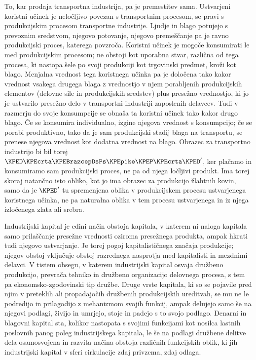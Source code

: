 \documentclass[kapital_02.tex]{subfiles}
\begin{document}
To, kar prodaja transportna industrija, pa je premestitev sama. Ustvarjeni koristni učinek je neločljivo povezan s transportnim procesom, se pravi s produkcijskim procesom transportne industrije. Ljudje in blago potujejo s prevoznim sredstvom, njegovo potovanje, njegovo premeščanje pa je ravno produkcijski proces, katerega povzroča. Koristni učinek je mogoče konsumirati le med produkcijskim procesom; ne obstoji kot uporabna stvar, različna od tega procesa, ki nastopa šele po svoji produkciji kot trgovinski predmet, kroži kot blago. Menjalna vrednost tega koristnega učinka pa je določena tako kakor vrednost vsakega drugega blaga z vrednostjo v njem porabljenih produkcijskih elementov (delovne sile in produkcijskih sredstev) plus presežno vrednostjo, ki jo je ustvarilo presežno delo v transportni industriji zaposlenih delavcev. Tudi v razmerju do svoje konsumpcije se obnaša ta koristni učinek tako kakor drugo blago. Če se konsumira individualno, izgine njegova vrednost s konsumpcijo; če se porabi produktivno, tako da je sam produkcijski stadij blaga na transportu, se prenese njegova vrednost kot dodatna vrednost na blago. Obrazec za transportno industrijo bi bil torej \(\KPED \KPEcrta \KPEBrazcepDsPs \KPEpike \KPEP \KPEcrta \KPED' \), ker plačamo in konsumiramo sam produkcijski proces, ne pa od njega ločljivi produkt. Ima torej skoraj natančno isto obliko, kot jo ima obrazec za produkcijo žlahtnih kovin, samo da je \(\KPED'\) tu spremenjena \KPEstran oblika v produkcijskem procesu ustvarjenega koristnega učinka, ne pa naturalna oblika v tem procesu ustvarjenega in iz njega izločenega zlata ali srebra.

Industrijski kapital je edini način obstoja kapitala, v katerem ni naloga kapitala samo prilaščanje presežne vrednosti oziroma presežnega produkta, ampak hkrati tudi njegovo ustvarjanje. Je torej pogoj kapitalističnega značaja produkcije; njegov obstoj vključuje obstoj razrednega nasprotja med kapitalisti in mezdnimi delavci. V tistem obsegu, v katerem industrijski kapital osvaja družbeno produkcijo, prevrača tehniko in družbeno organizacijo delovnega procesa, s tem pa ekonomsko-zgodovinski tip družbe. Druge vrste kapitala, ki so se pojavile pred njim v preteklih ali propadajočih družbenih produkcijskih ureditvah, se mu ne le podredijo in prilagodijo z mehanizmom svojih funkcij, ampak delujejo samo še na njegovi podlagi, živijo in umrjejo, stoje in padejo s to svojo podlago. Denarni in blagovni kapital sta, kolikor nastopata s svojimi funkcijami kot nosilca lastnih poslovnih panog poleg industrijskega kapitala, le še na podlagi družbene delitve dela osamosvojena in razvita načina obstoja različnih funkcijskih oblik, ki jih industrijski kapital v sferi cirkulacije zdaj privzema, zdaj odlaga.
\end{document}
